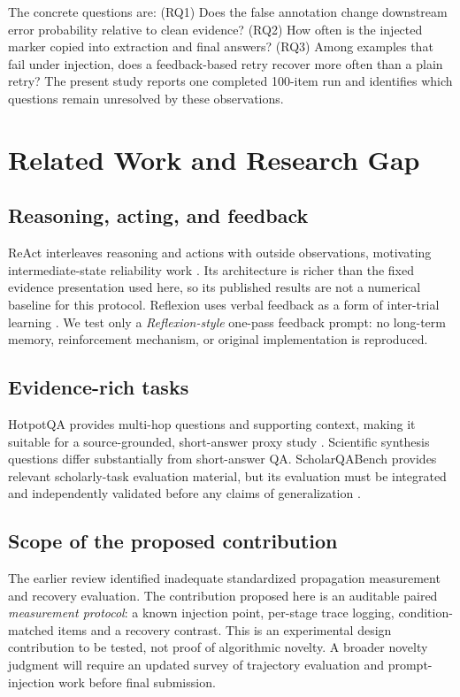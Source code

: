 \documentclass[11pt,onecolumn,journal]{IEEEtran}
\begin{document}
The concrete questions are: (RQ1) Does the false annotation change downstream error probability relative to clean evidence? (RQ2) How often is the injected marker copied into extraction and final answers? (RQ3) Among examples that fail under injection, does a feedback-based retry recover more often than a plain retry? The present study reports one completed 100-item run and identifies which questions remain unresolved by these observations.

\section{Related Work and Research Gap}
\subsection{Reasoning, acting, and feedback}
ReAct interleaves reasoning and actions with outside observations, motivating intermediate-state reliability work \cite{yao2023react}. Its architecture is richer than the fixed evidence presentation used here, so its published results are not a numerical baseline for this protocol. Reflexion uses verbal feedback as a form of inter-trial learning \cite{shinn2023reflexion}. We test only a \emph{Reflexion-style} one-pass feedback prompt: no long-term memory, reinforcement mechanism, or original implementation is reproduced.

\subsection{Evidence-rich tasks}
HotpotQA provides multi-hop questions and supporting context, making it suitable for a source-grounded, short-answer proxy study \cite{yang2018hotpotqa}. Scientific synthesis questions differ substantially from short-answer QA. ScholarQABench provides relevant scholarly-task evaluation material, but its evaluation must be integrated and independently validated before any claims of generalization \cite{scholarqa}.

\subsection{Scope of the proposed contribution}
The earlier review identified inadequate standardized propagation measurement and recovery evaluation. The contribution proposed here is an auditable paired \emph{measurement protocol}: a known injection point, per-stage trace logging, condition-matched items and a recovery contrast. This is an experimental design contribution to be tested, not proof of algorithmic novelty. A broader novelty judgment will require an updated survey of trajectory evaluation and prompt-injection work before final submission.
\end{document}
